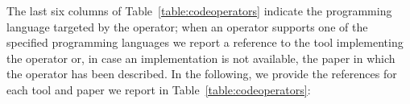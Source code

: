 
\newcommand{\OffuttADA}{\cite{rothermel1996experimental}}
\newcommand{\MUSIC}{\cite{phan2018music}}
\newcommand{\Sciror}{\cite{hariri2018srciror}}
\newcommand{\Mull}{\cite{denisov2018mull}}
\newcommand{\Accmut}{\cite{wang2017faster}}
\newcommand{\Major}{\cite{just2014major}}
\newcommand{\MuJava}{\cite{ma2006mujava}}
\newcommand{\TuyaSQL}{\cite{tuya2007mutating}}
\newcommand{\BinhSimulink}{\cite{binh2012mutation}}
\newcommand{\Proteum}{\cite{delamaro2001interface}}
\newcommand{\Shahriar}{\cite{shahriar2008mutation}} %
\newcommand{\SMT}{\cite{dan2012semantic}}
\newcommand{\MUSICShahriar}{\cite{shahriar2008music}}
\newcommand{\MuCPP}{\cite{delgado2017assessment}}
\newcommand{\jMINT}{\cite{grechanik2016mutation}}
\newcommand{\ILMutator}{\cite{derezinska2011object}}
\newcommand{\SQLChan}{\cite{chan2005fault}}
\newcommand{\BacterioSystem}{\cite{mateo2012validating}}
\newcommand{\Milu}{\cite{jia2008milu}}
\newcommand{\Judy}{\cite{madeyski2010judy}}


The last six columns of Table~\ref{table:codeoperators} indicate the programming language targeted by the operator; when an operator supports one of the specified programming languages we report a reference to the tool implementing the operator or, in case an implementation is not available, the paper in which the operator has been described. In the following, we provide the references for each tool and paper we report in Table~\ref{table:codeoperators}:

